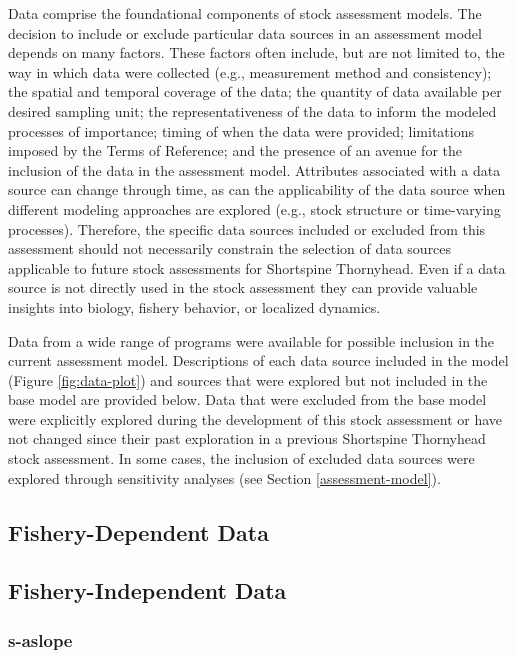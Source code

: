 \documentclass[11pt,
  english,
  letterpaper,
]{article}
\begin{document}
Data comprise the foundational components of stock assessment models. The decision to include or exclude particular data sources in an assessment model depends on many factors. These factors often include, but are not limited to, the way in which data were collected (e.g., measurement method and consistency); the spatial and temporal coverage of the data; the quantity of data available per desired sampling unit; the representativeness of the data to inform the modeled processes of importance; timing of when the data were provided; limitations imposed by the Terms of Reference; and the presence of an avenue for the inclusion of the data in the assessment model. Attributes associated with a data source can change through time, as can the applicability of the data source when different modeling approaches are explored (e.g., stock structure or time-varying processes). Therefore, the specific data sources included or excluded from this assessment should not necessarily constrain the selection of data sources applicable to future stock assessments for Shortspine Thornyhead. Even if a data source is not directly used in the stock assessment they can provide valuable insights into biology, fishery behavior, or localized dynamics.

Data from a wide range of programs were available for possible inclusion in the current assessment model. Descriptions of each data source included in the model (Figure \ref{fig:data-plot}) and sources that were explored but not included in the base model are provided below. Data that were excluded from the base model were explicitly explored during the development of this stock assessment or have not changed since their past exploration in a previous Shortspine Thornyhead stock assessment. In some cases, the inclusion of excluded data sources were explored through sensitivity analyses (see Section \ref{assessment-model}).

\hypertarget{fishery-dependent-data}{%
\subsection{Fishery-Dependent Data}\label{fishery-dependent-data}}

\hypertarget{fishery-independent-data}{%
\subsection{Fishery-Independent Data}\label{fishery-independent-data}}

\hypertarget{section}{%
\subsubsection{\texorpdfstring{\acrlong{s-aslope}}{}}\label{section}}
\end{document}
